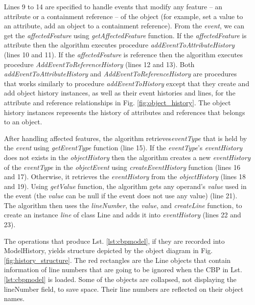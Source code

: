 \documentclass{llncs}
\begin{document}
Lines 9 to 14 are specified to handle events that modify any feature -- an attribute or a containment reference -- of the object (for example, set a value to an attribute, add an object to a containment reference). From the \emph{event}, we can get the \emph{affectedFeature} using \emph{getAffectedFeature} function. If the \emph{affectedFeature} is attribute then the algorithm executes procedure \emph{addEventToAttributeHistory} (lines 10 and 11). If the \emph{affectedFeature} is reference then the algorithm executes procedure \emph{AddEventToReferenceHistory} (lines 12 and 13). Both \emph{addEventToAttributeHistory} and \emph{AddEventToReferenceHistory} are procedures that works similarly to procedure \emph{addEventToHistory} except that they create and add object history instances, as well as their event histories and lines, for the attribute and reference relationships in Fig. \ref{fig:object_history}. The object history instances represents the history of attributes and references that belongs to an object.

After handling affected features, the algorithm retrieves\emph{eventType} that is held by the \emph{event} using \emph{getEventType} function (line 15). If the \emph{eventType}'s \emph{eventHistory} does not exists in the \emph{objectHistory} then the algorithm creates a new \emph{eventHistory} of the \emph{eventType} in the \emph{objectEvent}  using \emph{createEventHistory} function (lines 16 and 17). Otherwise, it retrieves the \emph{eventHistory} from the \emph{objectHistory} (lines 18 and 19). Using \emph{getValue} function, the algorithm gets any operand's \emph{value} used in the event (the \emph{value} can be null if the event does not use any value) (line 21). The algorithm then uses the \emph{lineNumber}, the \emph{value}, and \emph{createLine} function, to create an instance \emph{line} of class Line and adds it into \emph{eventHistory} (lines 22 and 23).   

The operations that produce Lst. \ref{lst:cbpmodel}, if they are recorded into ModelHistory, yields structure depicted by the object diagram in Fig. \ref{fig:history_structure}. The red rectangles are the Line objects that contain information of line numbers that are going to be ignored when the CBP in Lst. \ref{lst:cbpmodel} is loaded. Some of the objects are collapsed, not displaying the lineNumber field, to save space. Their line numbers are reflected on their object names.  
\end{document}
